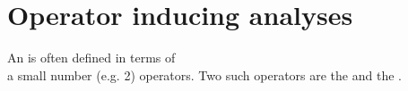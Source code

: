 

\section{Operator inducing analyses}
\hfill
\begin{minipage}{\tw-120mm}
  An  is often defined in terms of \\a small number (e.g. 2) operators.
  Two such operators are the  and the .
\end{minipage}
\hfill{}


